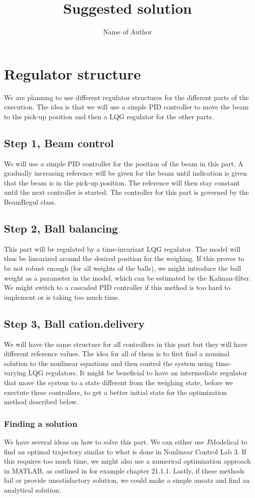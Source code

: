 \documentclass{article}
\title{Suggested solution}
\author{Name of Author}
\begin{document}
\maketitle

\section{Regulator structure}\label{regstruc}
We are planning to use different regulator structures for the different parts of the execution. The idea is that we will use a simple PID controller to move the beam to the pick-up position and then a LQG regulator for the other parts.
\subsection{Step 1, Beam control}
We will use a simple PID controller for the position of the beam in this part. A gradually increasing reference will be given for the beam until indication is given that the beam is in the pick-up position. The reference will then stay constant until the next controller is started. The controller for this part is governed by the BeamRegul class.
\subsection{Step 2, Ball balancing}\label{step2}
This part will be regulated by a time-invariant LQG regulator. The model will thus be linearized around the desired position for the weighing. If this proves to be not robust enough (for all weights of the balls), we might introduce the ball weight as a parameter in the model, which can be estimated by the Kalman-filter. We might switch to a cascaded PID controller if this method is too hard to implement or is taking too much time.
\subsection{Step 3, Ball cation.delivery}
We will have the same structure for all controllers in this part but they will have different reference values. The idea for all of them is to first find a nominal solution to the nonlinear equations and then control the system using time-varying LQG regulators. It might be beneficial to have an intermediate regulator that move the system to a state different from the weighing state, before we exectute these controllers, to get a better initial state for the optimization method described below.
\subsubsection{Finding a solution}
We have several ideas on how to solve this part. We can either use JModelical to find an optimal trajectory similar to what is done in Nonlinear Control Lab 3. If this requires too much time, we might also use a numerical optimization approach in MATLAB, as outlined in for example \cite{NR} chapter 21.1.1. Lastly, if these methods fail or provide unsatisfactory solution, we could make a simple ansatz and find an analytical solution.
\end{document}
